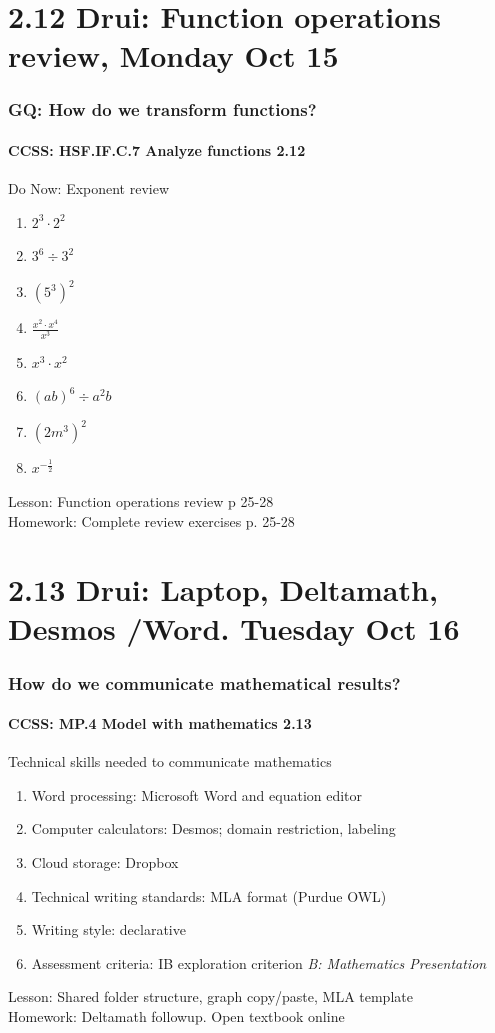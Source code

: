 \documentclass{beamer}
\begin{document}
\section{2.12 Drui: Function operations review, Monday Oct 15}
  \frame
  {
    \frametitle{GQ: How do we transform functions?}
    \framesubtitle{CCSS: HSF.IF.C.7 Analyze functions    \alert{2.12}}

    \begin{block}{Do Now: Exponent review}
    \begin{enumerate}
      \item $2^3 \cdot 2^2$
      \item $3^6 \div 3^2$
      \item $(5^3)^2$
      \item $\displaystyle \frac{x^2 \cdot x^4}{x^3}$
      \item $x^3 \cdot x^2$
      \item $(ab)^6 \div a^2 b$
      \item $(2m^3)^2$
      \item $\displaystyle x^{-\frac{1}{2}}$
    \end{enumerate}
    \end{block}
    Lesson: Function operations review p 25-28 \\
    Homework: Complete review exercises p. 25-28
  }

\section{2.13 Drui: Laptop, Deltamath, Desmos /Word. Tuesday Oct 16}
  \frame
  {
    \frametitle{How do we communicate mathematical results?}
    \framesubtitle{CCSS: MP.4 Model with mathematics  \alert{2.13}}

    \begin{block}{Technical skills needed to communicate mathematics}
    \begin{enumerate}
        \item Word processing: Microsoft Word and equation editor
        \item Computer calculators: Desmos; domain restriction, labeling
        \item Cloud storage: Dropbox
        \item Technical writing standards: MLA format (Purdue OWL)
        \item Writing style: declarative
        \item Assessment criteria: IB exploration criterion \emph{B: Mathematics Presentation}
    \end{enumerate}
    \end{block}
    Lesson: Shared folder structure, graph copy/paste, MLA template\\ \bigskip
    Homework: Deltamath followup. Open textbook online
  }
\end{document}
